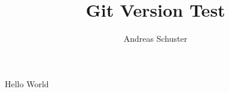 \documentclass[a4paper,10pt]{article}
\title{Git Version Test}
\author{Andreas Schuster}
\begin{document}
Hello World
\end{document}
